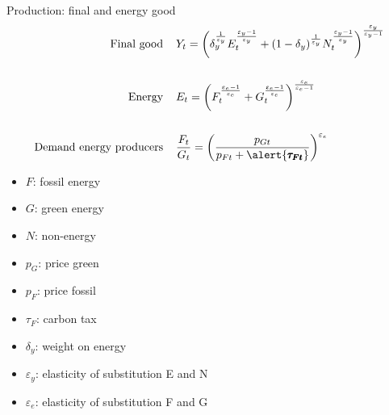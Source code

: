 \documentclass[11pt,aspectratio=169]{beamer}
\begin{document}
\begin{frame}{Production: final and energy good}
	\vspace{-10mm}
	\hypertarget{prodmod}{}
		\begin{align*}
\text{Final good}\hspace{4mm}&Y_t =\left(\delta_y^{\frac{1}{\varepsilon_y}}E_t^\frac{\varepsilon_y-1}{\varepsilon_y}+(1-\delta_y)^{\frac{1}{\varepsilon_y}}N_t^\frac{\varepsilon_y-1}{\varepsilon_y}\right)^\frac{\varepsilon_y}{\varepsilon_y-1} \\
\ \\
\text{Energy}\hspace{4mm}&E_t =\left({F}_t^\frac{\varepsilon_e-1}{\varepsilon_e}+G_t^\frac{\varepsilon_e-1}{\varepsilon_e}\right)^\frac{\varepsilon_e}{\varepsilon_e-1}\\
\ \\
\text{Demand energy producers}\hspace{4mm}&\frac{F_t}{G_t} = \left(\frac{p_{Gt}}{p_{Ft}+\alert{\pmb{\tau_{Ft}}}}\right)^{\varepsilon_e}
	\end{align*}
	
	\small
	\vspace{4mm}
	\hspace{-4mm}
		\begin{minipage}[t!]{0.23\textwidth}
		\vspace{0mm}
		\begin{itemize}	
			\item[]$F$: fossil energy
			\vspace{-2mm}	
			\item[]$G$: green energy
			\vspace{-7mm}	
			\item[]$N$: non-energy
		\end{itemize}
	\end{minipage}
	\begin{minipage}[t!]{0.22\textwidth}
		\vspace{0mm}
		\begin{itemize}
			\item[] $p_G$: price green  \vspace{-7mm}
			\item[] $p_F$: price fossil
			\vspace{-2mm}	
			\item[] $\tau_F$: carbon tax
		\end{itemize}
	\end{minipage}
	\begin{minipage}[t!]{0.55\textwidth}
		\vspace{0mm}
		\begin{itemize}
			\item[] $\delta_{y}$: weight on energy\vspace{-2mm}
			\item[] $\varepsilon_y$: elasticity of substitution E and N \vspace{-2mm}
				\item[] $\varepsilon_e$: elasticity of substitution F and G
		\end{itemize}
	\end{minipage}
\end{frame}
\end{document}
